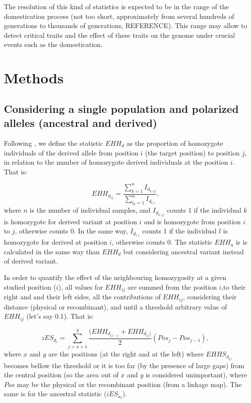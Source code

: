 \documentclass[a4paper,11pt]{article}
\begin{document}
The resolution of this kind of statistics is expected to be in the range of the domestication process (not too short, approximately from several hundreds of generations to  thousands of generations, REFERENCE). This range may allow to detect critical traits and the effect of these traits on the genome under crucial events such as the domestication.

\section{Methods}
\subsection{Considering a single population and polarized alleles (ancestral and derived)}
Following \cite{Sabeti:2002fv}, we define the statistic $EHH_d$ as the proportion of homozygote individuals of the derived allele from position $i$ (the target position) to position $j$, in relation to the number of homozygote derived individuals at the position $i$.  That is:

 \begin{equation}
 EHH_{d_{ij}} = \frac{\sum_{k=1}^{n}I_{d_{k,ij}}}{\sum_{l_d=1}^{n}I_{d_{l,i}}},
 \end{equation}
where $n$ is the number of individual samples, and $I_{d_{k,ij}}$ counts 1 if the individual $k$ is homozygote for derived variant at position $i$ and is homozygote from position $i$ to $j$, otherwise counts 0. In the same way, $I_{d_{l,i}}$ counts 1 if the individual $l$ is homozygote for derived at position $i$, otherwise counts 0. The statistic $EHH_a$ is is calculated in the same way than $EHH_d$ but considering ancestral variant instead of derived variant.  

In order to quantify the effect of the neighbouring homozygosity at a given studied position ($i$),  all values for $EHH_{ij}$ are summed from  the position $i$,to their right and and their left sides, all the contributions of $EHH_{ij}$, considering their distance (physical or recombinant), and until a threshold arbitrary value of $EHH_{ij}$ (let's say 0.1). That is: 

\begin{equation}
 iES_{d_i} = \sum_{j=x+1}^{y}\frac{(EHH_{d_{ij-1}} + EHH_{d_{ij})}}{2} (Pos_{j} - Pos_{j-1}),
 \end{equation}
where $x$ and $y$ are the positions (at the right and at the left) where $EHHS_{d_{ij}}$ becomes bellow the threshold or it is too far (by the presence of large gaps) from the central position (so the area out of $x$ and $y$ is considered unimportant), where $Pos$ may be the physical or the recombinant position (from a linkage map). The same is for the ancestral statistic ($iES_{a_i}$).
\end{document}
